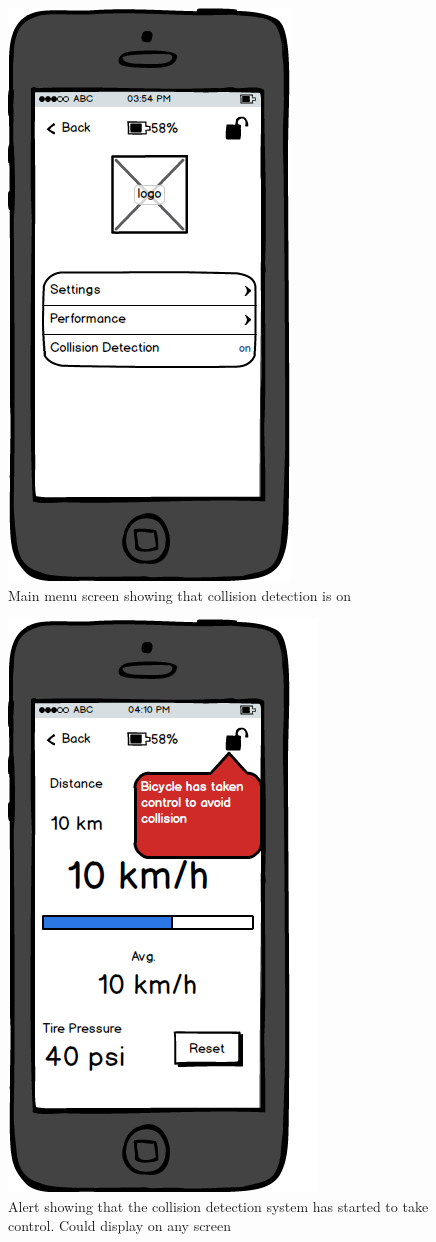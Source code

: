 \documentclass[a4paper]{report}
\begin{document}
\clearpage
\begin{figure}
\centering
\includegraphics[scale=0.9]{figures/prototype_1/collision_on}
\caption{Main menu screen showing that collision detection is on}
\end{figure}
\clearpage
\begin{figure}
\centering
\includegraphics[scale=0.8]{figures/prototype_1/control_alert_perf}
\caption{Alert showing that the collision detection system has started to take control. Could display on any screen}
\end{figure}
\end{document}
